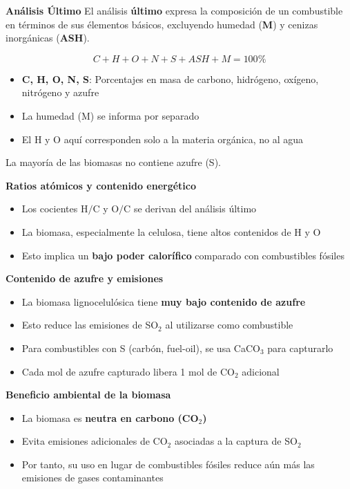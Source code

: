 \documentclass[../../main.tex]{subfiles}
\begin{document}
\begin{frame}{\textbf{An\'alisis \'Ultimo}}
El an\'alisis \textbf{\'ultimo} expresa la composici\'on de un combustible en t\'erminos de sus \'elementos b\'asicos, excluyendo humedad (\textbf{M}) y cenizas inorg\'anicas (\textbf{ASH}).

\[
C+H+O+N+S+ASH+M = 100\% 
\]

\begin{itemize}
  \item \textbf{C, H, O, N, S}: Porcentajes en masa de carbono, hidr\'ogeno, ox\'igeno, nitr\'ogeno y azufre
  \item La humedad (M) se informa por separado
  \item El H y O aqu\'i corresponden solo a la materia org\'anica, no al agua
\end{itemize}

La mayor\'ia de las biomasas no contiene azufre (S).
\end{frame}

\begin{frame}{\textbf{Ratios at\'omicos y contenido energ\'etico}}
\begin{itemize}
  \item Los cocientes \( \text{H/C} \) y \( \text{O/C} \) se derivan del an\'alisis \'ultimo
  \item La biomasa, especialmente la celulosa, tiene altos contenidos de H y O
  \item Esto implica un \textbf{bajo poder calor\'ifico} comparado con combustibles f\'osiles
\end{itemize}


\textbf{Contenido de azufre y emisiones}
\begin{itemize}
  \item La biomasa lignocelul\'osica tiene \textbf{muy bajo contenido de azufre}
  \item Esto reduce las emisiones de SO$_2$ al utilizarse como combustible
  \item Para combustibles con S (carb\'on, fuel-oil), se usa CaCO$_3$ para capturarlo
  \item Cada mol de azufre capturado libera 1 mol de CO$_2$ adicional
\end{itemize}
\end{frame}

\begin{frame}{\textbf{Beneficio ambiental de la biomasa}}
\begin{itemize}
  \item La biomasa es \textbf{neutra en carbono (CO$_2$)}
  \item Evita emisiones adicionales de CO$_2$ asociadas a la captura de SO$_2$
  \item Por tanto, su uso en lugar de combustibles f\'osiles reduce a\'un m\'as las emisiones de gases contaminantes
\end{itemize}
\end{frame}
\end{document}
